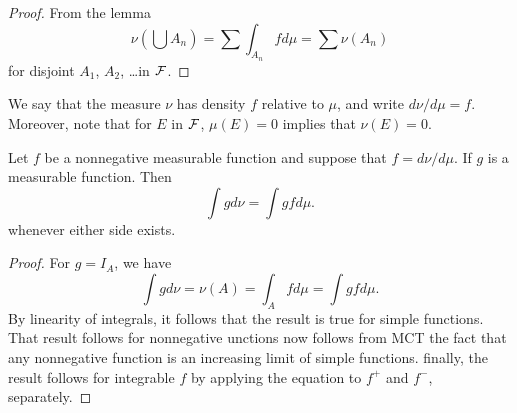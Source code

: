 \begin{proof}
From the lemma
\begin{equation*}
\nu\left(\bigcup A_n\right)=\sum \int_{A_n} f d\mu = \sum \nu(A_n)
\end{equation*}
for disjoint $A_1$, $A_2$, \ldots in $\mathcal F$.
\end{proof}



\begin{remark}
We say that the measure $\nu$ has density $f$ relative to $\mu$, and write $d\nu/d\mu=f$. Moreover, note that for $E$ in $\mathcal F$, $\mu(E)=0$ implies that $\nu(E)=0$.
\end{remark}




\begin{theorem}
Let $f$ be a nonnegative measurable function and suppose that $f=d\nu/d\mu$. If 
$g$ is a measurable function. Then
\begin{equation*}
\int gd\nu = \int gfd\mu.
\end{equation*}
whenever either side exists.
\end{theorem}



\begin{proof}
For $g=I_A$, we have
\begin{equation*}
\int gd\nu=\nu(A)=\int_A fd\mu = \int gfd\mu.
\end{equation*}
By linearity of integrals, it follows that the result is true for simple functions.
That result follows for nonnegative unctions now follows from MCT the fact that any 
nonnegative function is an increasing limit of simple functions. finally, the result follows for integrable $f$ by applying the equation to $f^+$ and $f^-$, separately.
\end{proof}